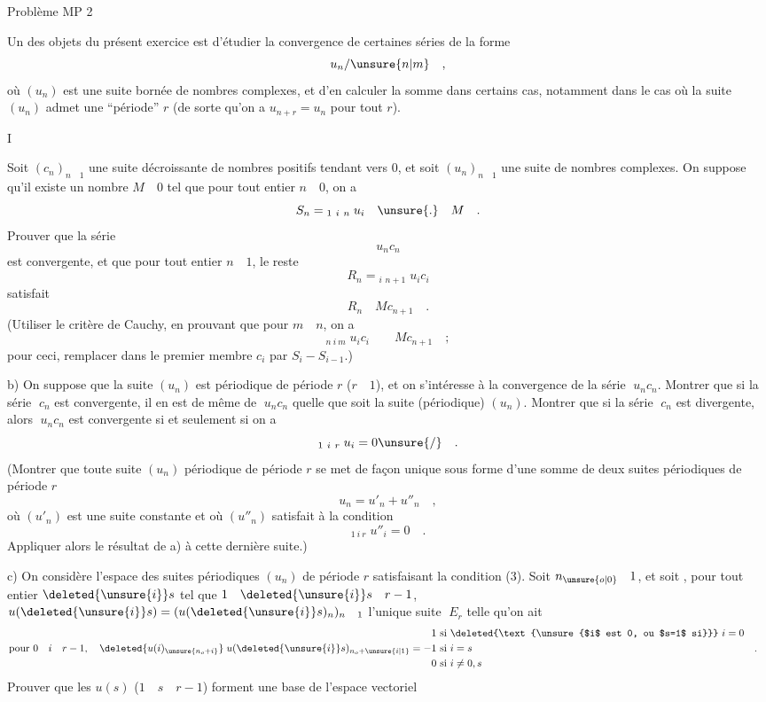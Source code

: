 Problème MP 2

Un des objets du présent exercice est d'étudier la convergence de certaines séries de la forme
\[
u_n/\unsure{n|m}\quad ,
\]
où $(u_n)$ est une suite bornée de nombres complexes, et d'en calculer la somme dans certains cas, notamment dans le cas où la suite $(u_n)$ admet une ``période'' $r$ (de sorte qu'on a $u_{n+r}=u_n$ pour tout $r$).

I

Soit $(c_n)_{n\quad1}$ une suite décroissante de nombres positifs tendant vers  0, et soit $(u_n)_{n\quad1}$ une suite de nombres complexes.  On suppose qu'il existe un nombre $M\quad0$ tel que pour tout entier $n\quad0$, on a
\[
S_n={}_{1\ i\ n}\;u_i\quad \unsure{.}\quad M\quad .
\]
 Prouver que la série
\[
u_n c_n
\]
est convergente, et que pour tout entier $n\quad1$, le reste
\[
R_n={}_{i\ \,n+1}\;u_i c_i
\]
satisfait
\[
R_n\quad Mc_{n+1}\quad .
\]
(Utiliser le critère de Cauchy, en prouvant que pour $m\quad n$, on a
\[
{}_{n\ i\ m}\;u_i c_i\qquad Mc_{n+1}\quad ;
\]
pour ceci, remplacer dans le premier membre $c_i$ par $S_i-S_{i-1}$.)

b) On suppose que la suite $(u_n)$ est périodique de période $r$ ($r\quad1$), et on s'intéresse à la convergence de la série $\;u_n c_n$. Montrer que si la série $\;c_n$ est convergente, il en est de même de $\;u_n c_n$ quelle que soit la suite (périodique) $(u_n)$. Montrer que si la série $\;c_n$ est divergente, alors $\;u_n c_n$ est convergente si et seulement si on a
\[
{}_{1\ i\ r}\;u_i=0\unsure{/}\quad .
\]
(Montrer que toute suite $(u_n)$ périodique de période $r$ se met de façon unique sous forme d'une somme de deux suites périodiques de période $r$
\[
u_n=u'_n+u''_n\quad ,
\]
où $(u'_n)$ est une suite constante et où $(u''_n)$ satisfait à la condition
\[
{}_{1\ i\ r}\;u''_i=0\quad .
\]
Appliquer alors le résultat de a) à cette dernière suite.)

c) On considère l'espace  des suites périodiques $(u_n)$ de période $r$ satisfaisant la condition (3). Soit $n_{\unsure{o|0}}\quad1$, et soit , pour tout entier $\deleted{\unsure{i}}s$ tel que $1\quad\deleted{\unsure{i}}s\quad r-1$, $u(\deleted{\unsure{i}}s)=(u(\deleted{\unsure{i}}s)_n)_{n\quad1}$ l'unique suite $\;E_r$ telle qu'on ait
\[
\begin{aligned}
\text{pour }0\quad i\quad r-1,\quad \deleted{u(i)_{\unsure{n_o+i}}}\;u(\deleted{\unsure{i}}s)_{n_o+\unsure{i|1}}&=\begin{aligned}
1&\ \text{si }\deleted{\text{\unsure{$i$ est 0, ou $s=1$ si}}}\ i=0\\
-1&\ \text{si }i=s\\
0&\ \text{si }i\ne0,s
\end{aligned}\quad .
\end{aligned}
\]
Prouver que les $u(s)$ ($1\quad s\quad r-1$) forment une base de l'espace vectoriel

